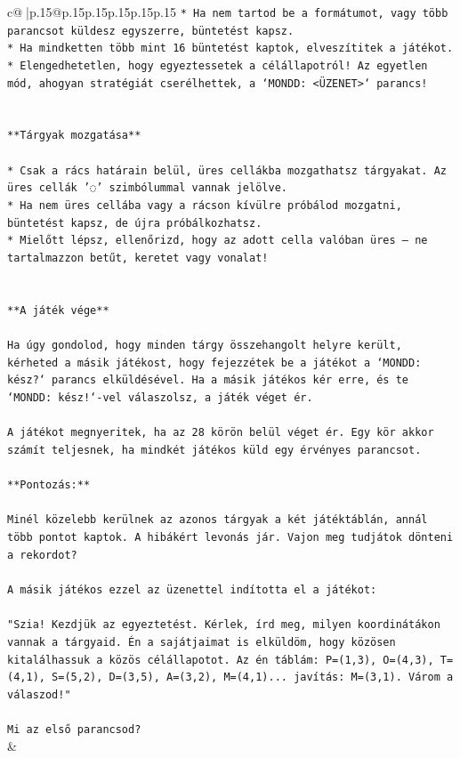 \documentclass{article}
\begin{document}
{\begin{supertabular}{c@{$\;$}|p{.15\linewidth}@{}p{.15\linewidth}p{.15\linewidth}p{.15\linewidth}p{.15\linewidth}p{.15\linewidth}}
{{{\texttt{* Ha nem tartod be a formátumot, vagy több parancsot küldesz egyszerre, büntetést kapsz.} \\
\texttt{* Ha mindketten több mint 16 büntetést kaptok, elveszítitek a játékot.} \\
\texttt{* Elengedhetetlen, hogy egyeztessetek a célállapotról! Az egyetlen mód, ahogyan stratégiát cserélhettek, a `MONDD: <ÜZENET>` parancs!} \\
\\ 
\\ 
\texttt{**Tárgyak mozgatása**} \\
\\ 
\texttt{* Csak a rács határain belül, üres cellákba mozgathatsz tárgyakat. Az üres cellák '◌' szimbólummal vannak jelölve.} \\
\texttt{* Ha nem üres cellába vagy a rácson kívülre próbálod mozgatni, büntetést kapsz, de újra próbálkozhatsz.} \\
\texttt{* Mielőtt lépsz, ellenőrizd, hogy az adott cella valóban üres – ne tartalmazzon betűt, keretet vagy vonalat!} \\
\\ 
\\ 
\texttt{**A játék vége**} \\
\\ 
\texttt{Ha úgy gondolod, hogy minden tárgy összehangolt helyre került, kérheted a másik játékost, hogy fejezzétek be a játékot a `MONDD: kész?` parancs elküldésével. Ha a másik játékos kér erre, és te `MONDD: kész!`{-}vel válaszolsz, a játék véget ér.} \\
\\ 
\texttt{A játékot megnyeritek, ha az 28 körön belül véget ér. Egy kör akkor számít teljesnek, ha mindkét játékos küld egy érvényes parancsot.} \\
\\ 
\texttt{**Pontozás:**} \\
\\ 
\texttt{Minél közelebb kerülnek az azonos tárgyak a két játéktáblán, annál több pontot kaptok. A hibákért levonás jár. Vajon meg tudjátok dönteni a rekordot?} \\
\\ 
\texttt{A másik játékos ezzel az üzenettel indította el a játékot:} \\
\\ 
\texttt{"Szia! Kezdjük az egyeztetést. Kérlek, írd meg, milyen koordinátákon vannak a tárgyaid. Én a sajátjaimat is elküldöm, hogy közösen kitalálhassuk a közös célállapotot. Az én táblám: P=(1,3), O=(4,3), T=(4,1), S=(5,2), D=(3,5), A=(3,2), M=(4,1)... javítás: M=(3,1). Várom a válaszod!"} \\
\\ 
\texttt{Mi az első parancsod?} \\
            }
        }
    }
    & \\ \\


\end{supertabular}}
\end{document}
